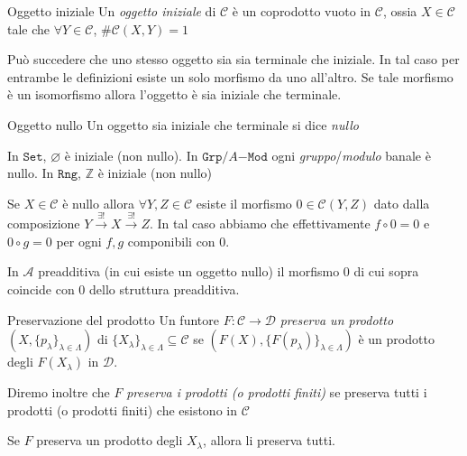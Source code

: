 \begin{definition}{Oggetto iniziale}
    Un \emph{oggetto iniziale} di \(\mathcal{\mathcal{C}}\) è un coprodotto vuoto in \(\mathcal{C}\), ossia \(X \in \mathcal{\mathcal{C}}\) tale che
    \(\forall Y \in \mathcal{\mathcal{C}}\), \(\# \mathcal{\mathcal{C}}{(X, Y)} = 1\) 
\end{definition}

Può succedere che uno stesso oggetto sia sia terminale che iniziale. In tal caso
per entrambe le definizioni esiste un solo morfismo da uno all'altro. Se tale
morfismo è un isomorfismo allora l'oggetto è sia iniziale che terminale.

\begin{definition}{Oggetto nullo}
    Un oggetto sia iniziale che terminale si dice \emph{nullo}
\end{definition}

\begin{example}{}
    In \(\mathtt{Set}\), \(\varnothing\) è iniziale (non nullo).
    In \(\mathtt{Grp}/A\mathtt{-Mod}\) ogni \emph{gruppo}/\emph{modulo} banale è
    nullo.
    In \(\mathtt{Rng}\), \(\mathbb{Z}\) è iniziale (non nullo)
\end{example}

    Se \(X \in \mathcal{\mathcal{C}}\) è nullo allora \(\forall Y, Z \in \mathcal{\mathcal{C}}\)
    esiste il morfismo \(0 \in \mathcal{\mathcal{C}}{(Y, Z)}\) dato dalla composizione
    \(Y \overset{\exists !}{\to } X \overset{\exists !}{\to } Z\). In tal caso
    abbiamo che effettivamente \(f \circ 0 = 0\) e \(0 \circ g = 0\)  per ogni
    \(f, g\) componibili con \(0\).
\begin{example}{}
    In \(\mathcal{A}\) preadditiva (in cui esiste un oggetto nullo) il morfismo
    0 di cui sopra coincide con 0 dello struttura preadditiva.
\end{example}

\begin{definition}{Preservazione del prodotto}
    Un funtore \(F : \mathcal{\mathcal{C}} \to \mathcal{D}\) \emph{preserva un prodotto}
    \({(X, \{p_\lambda\} _{\lambda \in \Lambda} )}\) di \(\{X_\lambda\}_{\lambda \in \Lambda} \subseteq \mathcal{\mathcal{C}} \) se \({(F{(X)}, \{F{(p_\lambda)}\}_{\lambda \in \Lambda}  )}\) è un prodotto degli \(F{(X_{\lambda} )}\) in \(\mathcal{D}\).

    Diremo inoltre che \(F\) \emph{preserva i prodotti (o prodotti finiti)} se preserva
    tutti i prodotti (o prodotti finiti) che esistono in \(\mathcal{\mathcal{C}}\) 
\end{definition}
\begin{remark}{}
    Se \(F\) preserva un prodotto degli \(X_\lambda\), allora li preserva tutti.
\end{remark}

